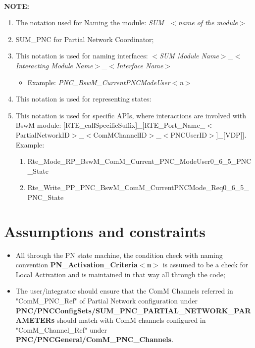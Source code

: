 \\


                

\textbf{NOTE:}

\begin{enumerate}
	\item The notation used for Naming the module: \textit{SUM\_$<$name of the module$>$}
	\item SUM\_PNC for Partial Network Coordinator;
	\item This notation is used for naming interfaces: \textit{$<$SUM Module Name$>$\_$<$Interacting Module Name$>$\_$<$Interface Name$>$}
	\begin{itemize}
		\item Example: \textit{PNC\_BswM\_CurrentPNCModeUser$<$n$>$}
	\end{itemize}
	\item This notation is used for representing states:
	\item This notation is used for specific APIs, where interactions are involved with BswM module:
	[RTE\_callSpecificSuffix]\_[RTE\_Port\_Name\_$<$PartialNetworkID$>$\_$<$ComMChannelID$>$\_$<$PNCUserID$>$]\_[VDP]]. Example:
	\begin{enumerate}[label=\Alph*.]
		\item Rte\_Mode\_RP\_BswM\_ComM\_Current\_PNC\_ModeUser0\_6\_5\_PNC\_State
		\item Rte\_Write\_PP\_PNC\_BswM\_ComM\_CurrentPNCMode\_Req0\_6\_5\_PNC\_State
	\end{enumerate}
\end{enumerate}

\section{Assumptions and constraints}

\begin{itemize}
	\item All through the PN state machine, the condition check with naming convention \textbf{PN\_Activation\_Criteria$<$n$>$} is assumed to be a check for Local Activation and is maintained in that way all through the code;
	\item The user/integrator should ensure that the ComM Channels referred in "ComM\_PNC\_Ref" of Partial Network configuration under \textbf{PNC/PNCConfigSets/SUM\_PNC\_PARTIAL\_NETWORK\_PARAMETERs} should match with ComM channels configured in "ComM\_Channel\_Ref" under \textbf{PNC/PNCGeneral/ComM\_PNC\_Channels}.  
\end{itemize}

